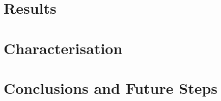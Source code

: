 \documentclass[letterpaper, 10 pt, conference]{ieeeconf}
\begin{document}
\section{Results}
  \label{section:results}
  

\section{Characterisation}
  \label{section:characterisation}
  

\section{Conclusions and Future Steps}
  \label{section:finale}
  






\balance
\end{document}
